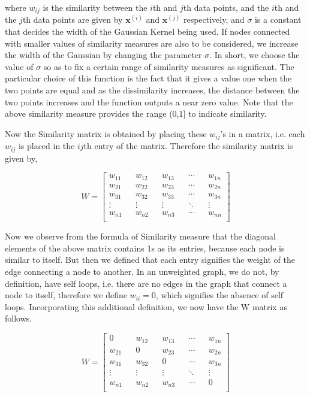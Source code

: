 \documentclass[english]{article}
\theoremstyle{plain}
\begin{document}
where $w_{ij}$ is the similarity between the $i$th and $j$th data points, and the $i$th and the $j$th data points are given by $\boldsymbol{x}^{(i)}$ and $\boldsymbol{x}^{(j)}$ respectively, and $\sigma$ is a constant that decides the width of the Gaussian Kernel being used. If nodes connected with smaller values of similarity measures are also to be considered, we increase the width of the Gaussian by changing the parameter $\sigma$. In short, we choose the value of $\sigma$ so as to fix a certain range of similarity measures as significant.
The particular choice of this function is the fact that it gives a value one when the two points are equal and as the dissimilarity increases, the distance between the two points increases and the function outputs a near zero value. Note that the above similarity measure provides the range (0,1] to indicate similarity.

Now the Similarity matrix is obtained by placing these $w_{ij}$'s in a matrix, i.e. each $w_{ij}$ is placed in the $ij$th entry of the matrix.
Therefore the similarity matrix is given by,

\begin{equation}
W = 
\begin{bmatrix}
w_{11} && w_{12} && w_{13} && \cdots && w_{1n} \\
w_{21} && w_{22} && w_{23} && \cdots && w_{2n} \\
w_{31} && w_{32} && w_{33} && \cdots && w_{3n} \\
\vdots && \vdots && \vdots && \ddots && \vdots \\
w_{n1} && w_{n2} && w_{n3} && \cdots && w_{nn} \\
\end{bmatrix}
\end{equation}

Now we observe from the formula of Similarity measure that the diagonal elements of the above matrix contains 1s as its entries, because each node is similar to itself. But then we defined that each entry signifies the weight of the edge connecting a node to another. In an unweighted graph, we do not, by definition, have self loops, i.e. there are no edges in the graph that connect a node to itself, therefore we define $w_{ii}=0$, which signifies the absence of self loops. Incorporating this additional definition, we now have the W matrix as follows.

\begin{equation}
W = 
\begin{bmatrix}
0 && w_{12} && w_{13} && \cdots && w_{1n} \\
w_{21} && 0 && w_{23} && \cdots && w_{2n} \\
w_{31} && w_{32} && 0 && \cdots && w_{3n} \\
\vdots && \vdots && \vdots && \ddots && \vdots \\
w_{n1} && w_{n2} && w_{n3} && \cdots && 0 \\
\end{bmatrix}
\end{equation}
\end{document}
